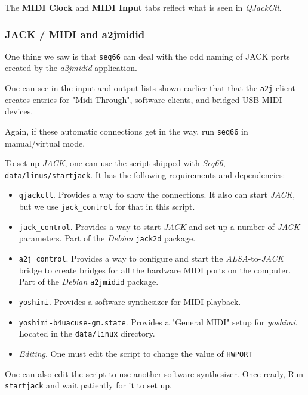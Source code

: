    The \textbf{MIDI Clock} and \textbf{MIDI Input} tabs reflect
   what is seen in \textsl{QJackCtl}.

\subsubsection{JACK / MIDI and a2jmidid}
\label{subsubsec:jack_midi_a2jmidid}

   One thing we saw is that \texttt{seq66} can deal with the odd naming
   of JACK ports created by the \textsl{a2jmidid} application.

   One can see in the input and output lists shown earlier
   that that the \texttt{a2j} client creates entries for "Midi Through",
   software clients, and bridged USB MIDI devices.

   Again, if these automatic connections get in the way, run \texttt{seq66} in
   manual/virtual mode.

   To set up \textsl{JACK}, one can use the script shipped with
   \textsl{Seq66}, \texttt{data/linus/startjack}.  It has the following
   requirements and dependencies:

   \begin{itemize}
      \item \texttt{qjackctl}.  Provides a way to show the connections. It also
         can start \textsl{JACK}, but we use \texttt{jack\_control} for that in
         this script.
      \item \texttt{jack\_control}.  Provides a way to start \textsl{JACK}
         and set up a number of \textsl{JACK} parameters.
         Part of the \textsl{Debian} \texttt{jack2d} package.
      \item \texttt{a2j\_control}.  Provides a way to configure and start the
         \textsl{ALSA}-to-\textsl{JACK} bridge to create bridges for all the
         hardware MIDI ports on the computer.
         Part of the \textsl{Debian} \texttt{a2jmidid} package.
      \item \texttt{yoshimi}.  Provides a software synthesizer for MIDI
         playback.
      \item \texttt{yoshimi-b4uacuse-gm.state}.  Provides a "General MIDI"
      setup for \textsl{yoshimi}.  Located in the \texttt{data/linux}
      directory.
      \item \textsl{Editing}.  One must edit the script to change the value of
      \texttt{HWPORT}
   \end{itemize}

   One can also edit the script to use another software synthesizer.
   Once ready, 
   Run \texttt{startjack} and wait patiently for it to set up.

